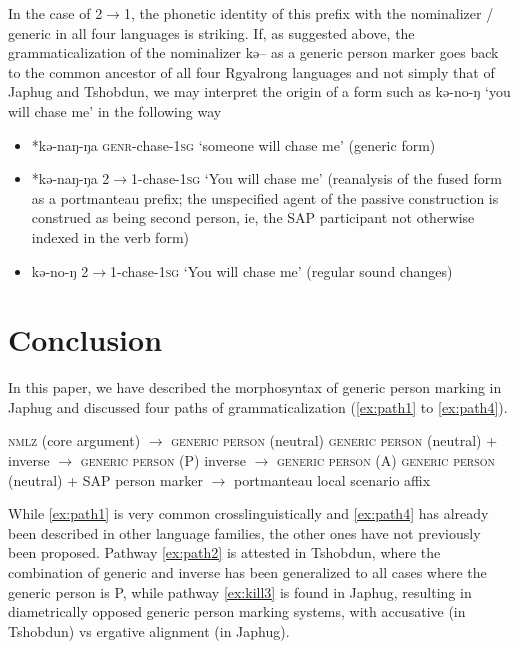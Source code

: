 \documentclass[oldfontcommands,oneside,a4paper,11pt]{article}
\newcommand{\ipa}[1]{{\phon \mbox{#1}}} %
\begin{document}
In the case of 2$\rightarrow$1, the phonetic identity of this prefix with the nominalizer / generic in all four languages is striking. If, as suggested above, the grammaticalization of the nominalizer \ipa{kə--} as a generic person marker goes back to the common ancestor of all four Rgyalrong languages and not simply that of Japhug and Tshobdun, we may interpret the origin of a form such as \ipa{kə-no-ŋ} `you will chase me' in the following way


\begin{itemize}
\item *\ipa{kə-naŋ-ŋa}  \textsc{genr}-chase-\textsc{1sg} `someone will chase me' (generic form)
\item  *\ipa{kə-naŋ-ŋa}  2$\rightarrow$1-chase-\textsc{1sg} `You will chase me' (reanalysis of the fused form as a portmanteau prefix; the unspecified agent of the passive construction is construed as being second person, ie, the SAP participant not otherwise indexed in the verb form)
\item  \ipa{kə-no-ŋ} 2$\rightarrow$1-chase-\textsc{1sg} `You will chase me'  (regular sound changes)
\end{itemize}
 
\section{Conclusion}
In this paper, we have described the morphosyntax of generic person marking in Japhug and discussed four paths of grammaticalization (\ref{ex:path1} to \ref{ex:path4}).


\begin{exe}
\ex \label{ex:path1}
\glt  \textsc{nmlz} (core argument) $\rightarrow$ \textsc{generic person} (neutral)
\ex \label{ex:path2}
\glt  \textsc{generic person} (neutral) + inverse  $\rightarrow$ \textsc{generic person} (P)
\ex \label{ex:path3}
\glt inverse  $\rightarrow$ \textsc{generic person} (A)
\ex \label{ex:path4}
\glt  \textsc{generic person} (neutral) + SAP person marker  $\rightarrow$ portmanteau local scenario affix
\end{exe}

While \ref{ex:path1} is very common crosslinguistically and \ref{ex:path4} has already been described in other language families, the other ones have not previously been proposed. Pathway \ref{ex:path2} is attested in Tshobdun, where the combination of generic and inverse has been generalized to all cases where the generic person is P, while pathway \ref{ex:kill3} is found in Japhug, resulting in diametrically opposed generic person marking systems, with accusative (in Tshobdun) vs ergative alignment (in Japhug).



\end{document}
